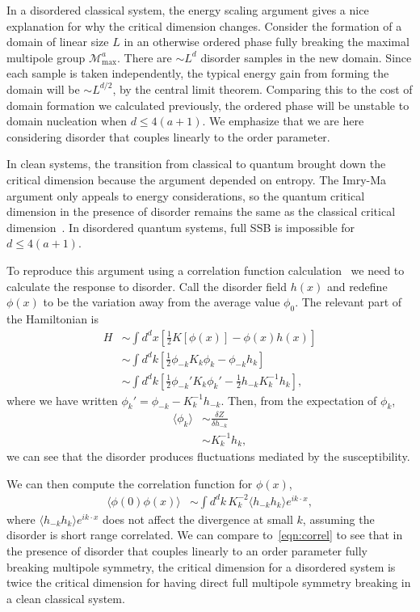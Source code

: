 \documentclass[prb,aps,twocolumn, amsfonts,amsmath,amssymb,nofootinbib,superscriptaddress]{revtex4-2}
\newcommand{\nn}{\nonumber\\}
\renewcommand{\max}{\text{max}}
\newcommand{\half}{\frac{1}{2}}
\begin{document}
In a disordered classical system, the energy scaling argument gives a nice explanation for why the critical dimension changes. Consider the formation of a domain of linear size $L$ in an otherwise ordered phase fully breaking the maximal multipole group $\mathcal{M}^a_\max$. There are $\sim L^d$ disorder samples in the new domain. Since each sample is taken independently, the typical energy gain from forming the domain will be $\sim L^{d/2}$, by the central limit theorem. Comparing this to the cost of domain formation we calculated previously, the ordered phase will be unstable to domain nucleation when $d\le 4(a+1)$. We emphasize that we are here considering disorder that couples linearly to the order parameter. 

In clean systems, the transition from classical to quantum brought down the critical dimension because the argument depended on entropy. The Imry-Ma argument only appeals to energy considerations, so the quantum critical dimension in the presence of disorder remains the same as the classical critical dimension~\cite{Vojta2013}. In disordered quantum systems, full SSB is impossible for $d\le 4(a+1)$.

To reproduce this argument using a correlation function calculation~\cite{ImryMa} we need to calculate the response to disorder. Call the disorder field $h(x)$ and redefine $\phi(x)$ to be the variation away from the average value $\phi_0$. The relevant part of the Hamiltonian is 
\begin{align}
H &\sim \int d^dx \left[ \half K[ \phi(x)] - \phi(x) h(x) \right] \nn
&\sim \int d^dk \left[ \half \phi_{-k} K_k \phi_k - \phi_{-k} h_k \right] \nn
&\sim \int d^dk \left[ \half \phi_{-k}' K_k \phi_k' - \half h_{-k} K^{-1}_k h_k \right],
\end{align}
where we have written $\phi_k' = \phi_{-k} - K^{-1}_k h_{-k}$. Then, from the expectation of $\phi_k$,
\begin{align}
\langle \phi_k \rangle &\sim \frac{\delta Z}{\delta h_{-k} } \nn
&\sim K_k^{-1} h_{k},
\end{align}
we can see that the disorder produces fluctuations mediated by the susceptibility.

We can then compute the correlation function for $\phi(x)$,
\begin{align}
\langle \phi(0) \phi(x) \rangle &\sim \int d^dk \, K_k^{-2} \langle h_{-k} h_{k} \rangle e^{ik\cdot x},
\end{align}
where $\langle h_{-k} h_{k} \rangle e^{ik\cdot x}$ does not affect the divergence at small $k$, assuming the disorder is short range correlated. We can compare to~\eqref{eqn:correl} to see that in the presence of disorder that couples linearly to an order parameter fully breaking multipole symmetry, the critical dimension for a disordered system is twice the critical dimension for having direct full multipole symmetry breaking in a clean classical system.
\end{document}

